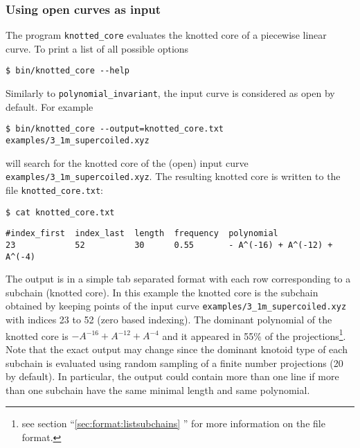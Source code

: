 \subsubsection{Using open curves as input}
The program \lstinline{knotted_core} evaluates the knotted core of a piecewise linear curve. To print a list of all possible options
\begin{lstlisting}
$ bin/knotted_core --help
\end{lstlisting}
Similarly to \lstinline{polynomial_invariant}, the input curve is considered as open by default. For example
\begin{lstlisting}
$ bin/knotted_core --output=knotted_core.txt examples/3_1m_supercoiled.xyz
\end{lstlisting}
will search for the knotted core of the (open) input curve \lstinline{examples/3_1m_supercoiled.xyz}. The resulting knotted core is written to the file \lstinline{knotted_core.txt}:
\begin{lstlisting}
$ cat knotted_core.txt
\end{lstlisting}
\begin{lstlisting}
#index_first  index_last  length  frequency  polynomial
23            52          30      0.55       - A^(-16) + A^(-12) + A^(-4)
\end{lstlisting}
The output is in a simple tab separated format with each row corresponding to a subchain (knotted core). In this example the knotted core is the subchain obtained by keeping points of the input curve \lstinline{examples/3_1m_supercoiled.xyz} with indices 23 to 52 (zero based indexing). The dominant polynomial of the knotted core is $-A^{-16}+A^{-12}+A^{-4}$ and it appeared in 55\% of the projections\footnote{see section ``\ref{sec:format:listsubchains} '' for more information on the file format.}. Note that the exact output may change since the dominant knotoid type of each subchain is evaluated using random sampling of a finite number projections (20 by default). %
In particular, the output could contain more than one line if more than one subchain have the same minimal length and same polynomial.

